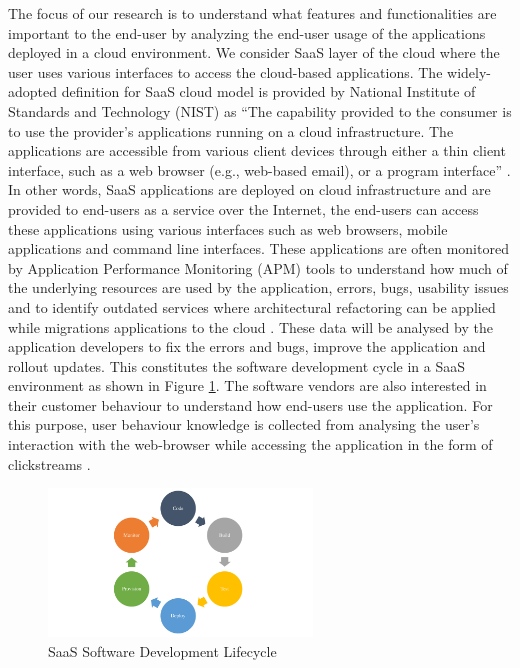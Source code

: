 \documentclass[a4paper,twoside]{article}
\begin{document}
The focus of our research is to understand what features and functionalities are important to the end-user by analyzing the end-user usage of the applications deployed in a cloud environment. We consider SaaS layer of the cloud where the user uses various interfaces to access the cloud-based applications. The widely-adopted definition for SaaS cloud model is provided by National Institute of Standards and Technology (NIST) as “The capability provided to the consumer is to use the provider’s applications running on a cloud infrastructure. The applications are accessible from various client devices through either a thin client interface, such as a web browser (e.g., web-based email), or a program interface” \cite{Mell2011TheComputing}. In other words, SaaS applications are deployed on cloud infrastructure and are provided to end-users as a service over the Internet, the end-users can access these applications using various interfaces such as web browsers, mobile applications and command line interfaces. These applications are often monitored by Application Performance Monitoring (APM) tools to understand how much of the underlying resources are used by the application, errors, bugs, usability issues and to identify outdated services where architectural refactoring can be applied while migrations applications to the cloud \cite{Kesavulu2017GenericPaper}. These data will be analysed by the application developers to fix the errors and bugs, improve the application and rollout updates. This constitutes the software development cycle in a SaaS environment as shown in Figure \ref{fig:fig2}. The software vendors are also interested in their customer behaviour to understand how end-users use the application. For this purpose, user behaviour knowledge is collected from analysing the user’s interaction with the web-browser while accessing the application in the form of clickstreams \cite{Pachidi2014UnderstandingMining,Wang2016UnsupervisedAnalysis}.

\begin{figure}[!h]
 \centering
 \includegraphics[width = 7cm]{SaaS_Software_Development_Lifecycle.pdf}
 \caption{SaaS Software Development Lifecycle}
 \label{fig:fig2}
\end{figure}
\end{document}
